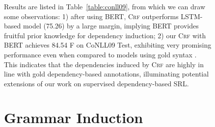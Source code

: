\documentclass[11pt]{article}
\begin{document}
\begin{figure}[tb!]
Results are listed in Table~\ref{table:conll09}, from which we can draw some observations:
1) after using BERT, \textsc{Crf} outperforms LSTM-based model (75.26) by a large margin, implying BERT provides fruitful prior knowledge for dependency induction;
2) our \textsc{Crf} with BERT achieves 84.54 F on CoNLL09 Test, exhibiting very promising performance even when compared to models using gold syntax \cite{johansson-nugues-2008-dependency-based,li-etal-2019-dependency}.
This indicates that the dependencies induced by \textsc{Crf} are highly in line with gold dependency-based annotations, illuminating potential extensions of our work on supervised dependency-based SRL.

\section{Grammar Induction}\label{sec:induction}




\end{figure}
\end{document}
